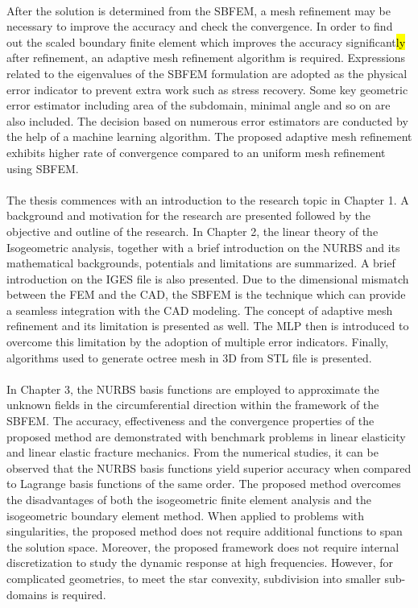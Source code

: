 \paragraph{}
After the solution is determined from the SBFEM, a mesh refinement may be necessary to improve the accuracy and check the convergence.
In order to find out the scaled boundary finite element which improves the accuracy significant\hl{ly} after refinement, an adaptive mesh refinement algorithm is required.
Expressions related to the eigenvalues of the SBFEM formulation are adopted as the physical error indicator to prevent extra work such as stress recovery.
Some key geometric error estimator including area of the subdomain, minimal angle and so on are also included.
The decision based on numerous error estimators are conducted by the help of a machine learning algorithm.
The proposed adaptive mesh refinement exhibits higher rate of convergence compared to an uniform mesh refinement using SBFEM.

\paragraph{}
The thesis commences with an introduction to the research topic in Chapter 1.
A background and motivation for the research are presented followed by the objective and outline of the research.
In Chapter 2, the linear theory of the Isogeometric analysis, together with a brief introduction on the NURBS and its mathematical backgrounds, potentials and limitations are summarized.
A brief introduction on the IGES file is also presented.
Due to the dimensional mismatch between the FEM and the CAD, the SBFEM is the technique which can provide a seamless integration with the CAD modeling.
The concept of adaptive mesh refinement and its limitation is presented as well.
The MLP then is introduced to overcome this limitation by the adoption of multiple error indicators.
Finally, algorithms used to generate octree mesh in 3D from STL file is presented.

\paragraph{}
In Chapter 3, the NURBS basis functions are employed to approximate the unknown fields in the circumferential direction within the framework of the SBFEM.
The accuracy, effectiveness and the convergence properties of the proposed method are demonstrated with benchmark problems in linear elasticity and linear elastic fracture mechanics.
From the numerical studies, it can be observed that the NURBS basis functions yield superior accuracy when compared to Lagrange basis functions of the same order.
The proposed method overcomes the disadvantages of both the isogeometric finite element analysis and the isogeometric boundary element method. 
When applied to problems with singularities, the proposed method does not require additional functions to span the solution space.
Moreover, the proposed framework does not require internal discretization to study the dynamic response at high frequencies.
However, for complicated geometries, to meet the star convexity, subdivision into smaller sub-domains is required.

